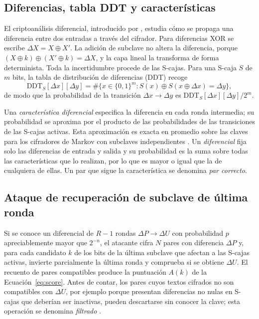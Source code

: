 \subsection{Diferencias, tabla DDT y características}

El criptoanálisis diferencial, introducido por \citet{biham1991}, estudia cómo se propaga una diferencia entre dos entradas a través del cifrador. Para diferencias XOR se escribe \(\Delta X=X\oplus X'\). La adición de subclave no altera la diferencia, porque \((X\oplus k)\oplus(X'\oplus k)=\Delta X\), y la capa lineal la transforma de forma determinista. Toda la incertidumbre procede de las S-cajas. Para una S-caja \(S\) de \(m\) bits, la tabla de distribución de diferencias (DDT) recoge
\begin{equation}
 \mathrm{DDT}_S[\Delta x][\Delta y]=\#\{x\in\{0,1\}^m : S(x)\oplus S(x\oplus\Delta x)=\Delta y\},
 \label{eq:ddt}
\end{equation}
de modo que la probabilidad de la transición \(\Delta x\to\Delta y\) es \(\mathrm{DDT}_S[\Delta x][\Delta y]/2^m\).

Una \emph{característica diferencial} especifica la diferencia en cada ronda intermedia; su probabilidad se aproxima por el producto de las probabilidades de las transiciones de las S-cajas activas. Esta aproximación es exacta en promedio sobre las claves para los cifradores de Markov con subclaves independientes \citep{lai1991}. Un \emph{diferencial} fija solo las diferencias de entrada y salida y su probabilidad es la suma sobre todas las características que lo realizan, por lo que es mayor o igual que la de cualquiera de ellas. Un par que sigue la característica se denomina \emph{par correcto}.

\subsection{Ataque de recuperación de subclave de última ronda}

Si se conoce un diferencial de \(R-1\) rondas \(\Delta P\to\Delta U\) con probabilidad \(p\) apreciablemente mayor que \(2^{-n}\), el atacante cifra \(N\) pares con diferencia \(\Delta P\) y, para cada candidato \(k\) de los bits de la última subclave que afectan a las S-cajas activas, invierte parcialmente la última ronda y comprueba si se obtiene \(\Delta U\). El recuento de pares compatibles produce la puntuación \(A(k)\) de la Ecuación~\ref{eq:score}. Antes de contar, los pares cuyos textos cifrados no son compatibles con \(\Delta U\), por ejemplo porque presentan diferencias no nulas en S-cajas que deberían ser inactivas, pueden descartarse sin conocer la clave; esta operación se denomina \emph{filtrado} \citep{biham1991}.

